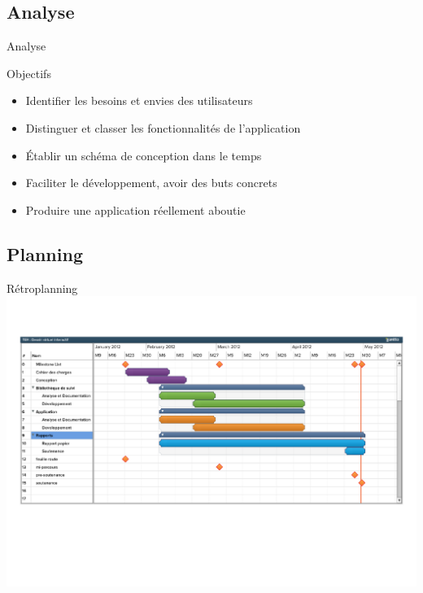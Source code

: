 \documentclass{beamer}
\begin{document}
      \subsection{Analyse}
            \begin{frame}{Analyse}
                  \begin{exampleblock}{Objectifs}
                        \begin{itemize}
                              \item{Identifier les besoins et envies des utilisateurs}
                              \item{Distinguer et classer les fonctionnalités de l'application}
                              \item{Établir un schéma de conception dans le temps}
                              \item{Faciliter le développement, avoir des buts concrets}
                              \item{Produire une application réellement aboutie}
                        \end{itemize}
                  \end{exampleblock}
            \end{frame}
      
      \subsection{Planning}
            \begin{frame}{Rétroplanning}      
                  \includegraphics[scale=0.40]{./retro-planning.pdf}
            \end{frame}
\end{document}
